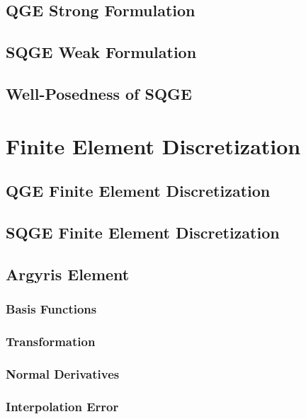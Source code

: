\documentclass[12pt,doublespace]{VTthesis}
\begin{document}
    \section{QGE Strong Formulation} \label{sec:QGEStrong}
    
    \section{SQGE Weak Formulation} \label{sec:SQGEStrong}
    
    \section{Well-Posedness of SQGE} \label{sec:WellPosed}
    

    \chapter{Finite Element Discretization}\label{ch:FEM}
    
    \section{QGE Finite Element Discretization} \label{sec:QGEFEM}
    
    \section{SQGE Finite Element Discretization} \label{sec:SQGEFEM}
    
    \section{Argyris Element} \label{sec:Argyris}
    
      \subsection{Basis Functions} \label{sse:Basis}
      
      \subsection{Transformation} \label{sse:Trans}
      
      \subsection{Normal Derivatives} \label{sse:Normals}
      
      \subsection{Interpolation Error} \label{sse:IntErr}
      
\end{document}
